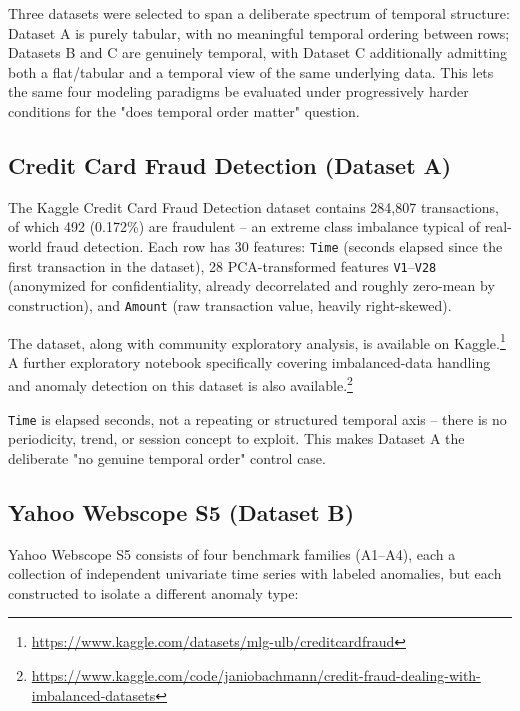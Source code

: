 Three datasets were selected to span a deliberate spectrum of temporal structure: Dataset A is purely tabular, with no meaningful temporal ordering between rows; Datasets B and C are genuinely temporal, with Dataset C additionally admitting both a flat/tabular and a temporal view of the same underlying data. This lets the same four modeling paradigms be evaluated under progressively harder conditions for the "does temporal order matter" question.

\subsection{Credit Card Fraud Detection (Dataset A)}

The Kaggle Credit Card Fraud Detection dataset contains 284{,}807 transactions, of which 492 (0.172\%) are fraudulent -- an extreme class imbalance typical of real-world fraud detection. Each row has 30 features: \texttt{Time} (seconds elapsed since the first transaction in the dataset), 28 PCA-transformed features \texttt{V1}--\texttt{V28} (anonymized for confidentiality, already decorrelated and roughly zero-mean by construction), and \texttt{Amount} (raw transaction value, heavily right-skewed).

The dataset, along with community exploratory analysis, is available on Kaggle.\footnote{\url{https://www.kaggle.com/datasets/mlg-ulb/creditcardfraud}} A further exploratory notebook specifically covering imbalanced-data handling and anomaly detection on this dataset is also available.\footnote{\url{https://www.kaggle.com/code/janiobachmann/credit-fraud-dealing-with-imbalanced-datasets}}

\texttt{Time} is elapsed seconds, not a repeating or structured temporal axis -- there is no periodicity, trend, or session concept to exploit. This makes Dataset A the deliberate "no genuine temporal order" control case.

\subsection{Yahoo Webscope S5 (Dataset B)}

Yahoo Webscope S5 consists of four benchmark families (A1--A4), each a collection of independent univariate time series with labeled anomalies, but each constructed to isolate a different anomaly type:

\begin{center}
\end{center}

